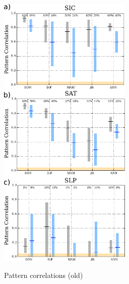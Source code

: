 \documentclass[twocol]{ametsoc}
\begin{document}
\begin{figure}
  \noindent\includegraphics[width=15pc,angle=0]{pattcorrseas_cmpmeanBC.pdf}\\
  \caption{Pattern correlations (old)
}\label{fig:fig4}
\end{figure}

\clearpage

\end{document}

